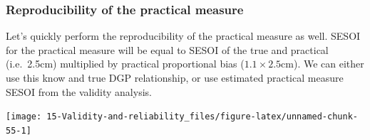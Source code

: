 \documentclass[
]{book}
\newenvironment{Shaded}{\begin{snugshade}}{\end{snugshade}}
\newcommand{\DataTypeTok}[1]{\textcolor[rgb]{0.13,0.29,0.53}{#1}}
\newcommand{\FloatTok}[1]{\textcolor[rgb]{0.00,0.00,0.81}{#1}}
\newcommand{\KeywordTok}[1]{\textcolor[rgb]{0.13,0.29,0.53}{\textbf{#1}}}
\newcommand{\NormalTok}[1]{#1}
\newcommand{\OperatorTok}[1]{\textcolor[rgb]{0.81,0.36,0.00}{\textbf{#1}}}
\newcommand{\StringTok}[1]{\textcolor[rgb]{0.31,0.60,0.02}{#1}}
\begin{document}
\hypertarget{reproducibility-of-the-practical-measure}{%
\subsubsection{Reproducibility of the practical measure}\label{reproducibility-of-the-practical-measure}}

Let's quickly perform the reproducibility of the practical measure as well. SESOI for the practical measure will be equal to SESOI of the true and practical (i.e.~2.5cm) multiplied by practical proportional bias (\(1.1 \times 2.5\)cm). We can either use this know and true DGP relationship, or use estimated practical measure SESOI from the validity analysis.

\begin{Shaded}
\end{Shaded}

\begin{center}\texttt{[image: 15-Validity-and-reliability\_files/figure-latex/unnamed-chunk-55-1]} \end{center}
\end{document}

